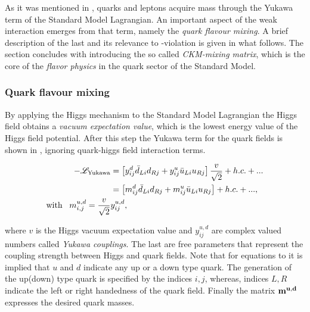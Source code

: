 As it was mentioned in , quarks and leptons acquire mass through the Yukawa term
of the Standard Model Lagrangian. An important aspect of the weak interaction emerges from that term,
namely the {\it quark flavour mixing}. A brief description of the last and its relevance to \CP-violation is given in what follows.
The section concludes with introducing the so called {\it CKM-mixing matrix}, which is the core of the
{\it flavor physics} in the quark sector of the Standard Model.

\subsubsection{Quark flavour mixing}
By applying the Higgs mechanism \cite{PhysRevLett.13.321,PhysRevLett.13.508} to the Standard Model Lagrangian the Higgs field obtains a
{\it vacuum expectation value}, which is the lowest energy value of the Higgs field potential.
After this step the Yukawa term for the quark fields is shown in ,
 ignoring quark-higgs field interaction terms.

\begin{subequations}
\label{yukawa_flavour}
\centering
  \begin{align}
  -\mathscr{L}_{\text{Yukawa}} &= \left[ y_{ij}^d \bar{d}_{Li} d_{Rj} + y_{ij}^u \bar{u}_{Li} u_{Rj} \right] \frac{v}{\sqrt{2}} + h.c. + ...  \\
                               &= \left[ m_{ij}^d \bar{d}_{Li} d_{Rj} + m_{ij}^u \bar{u}_{Li} u_{Rj} \right] + h.c. + ...,  \\
                               \text{with} \;\;\; m^{u,d}_{i,j} = \frac{v}{\sqrt{2}} & y_{ij}^{u,d}, \nonumber
  \end{align}
\end{subequations}

\noindent where $v$ is the Higgs vacuum expectation value and $y_{ij}^{u,d}$ are complex valued numbers called {\it Yukawa couplings}.
The last are free parameters that represent the coupling strength between Higgs and quark fields.
Note that for equations  to  it is implied that $u$ and $d$ indicate
any up or a down type quark. The generation of the up(down) type quark is specified by the indices $i,j$,
whereas, indices $L,R$ indicate the left or right handedness of the quark field.
Finally the matrix $\bf m^{u,d}$ expresses the desired quark masses.

